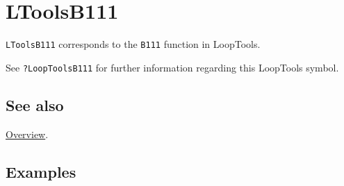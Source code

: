 \documentclass[../FeynHelpersManual.tex]{subfiles}
\begin{document}
\hypertarget{ltoolsb111}{
\section{LToolsB111}\label{ltoolsb111}}

\texttt{LToolsB111} corresponds to the \texttt{B111} function in
LoopTools.

See \texttt{?LoopTools\textasciigrave B111} for further information
regarding this LoopTools symbol.

\subsection{See also}

\hyperlink{toc}{Overview}.

\subsection{Examples}
\end{document}

